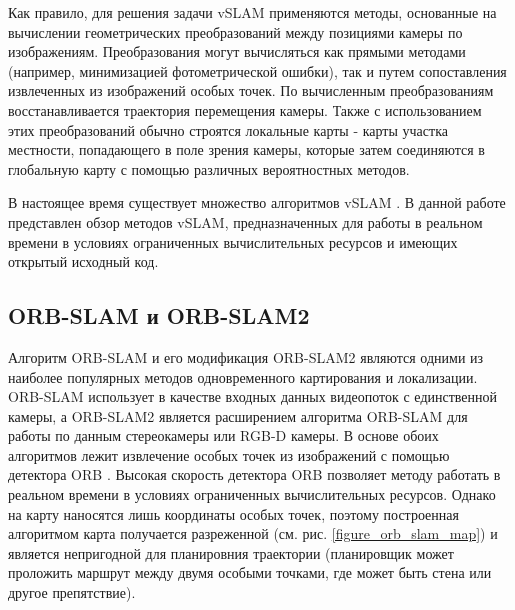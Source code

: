 \documentclass{mipt-thesis-ms}
\begin{document}
	Как правило, для решения задачи vSLAM применяются методы, основанные на вычислении геометрических преобразований между позициями камеры по изображениям. Преобразования могут вычисляться как прямыми методами (например, минимизацией фотометрической ошибки), так и путем сопоставления извлеченных из изображений особых точек. По вычисленным преобразованиям восстанавливается траектория перемещения камеры. Также с использованием этих преобразований обычно строятся локальные карты - карты участка местности, попадающего в поле зрения камеры, которые затем соединяются в глобальную карту с помощью различных вероятностных методов.
	
	В настоящее время существует множество алгоритмов vSLAM \cite{taketomi2017visual} \cite{fuentes2015visual}. В данной работе представлен обзор методов vSLAM, предназначенных для работы в реальном времени в условиях ограниченных вычислительных ресурсов и имеющих открытый исходный код.
	
	\subsection{ORB-SLAM и ORB-SLAM2}
	
	Алгоритм ORB-SLAM \cite{mur2015orb} и его модификация ORB-SLAM2 \cite{mur2017orb} являются одними из наиболее популярных методов одновременного картирования и локализации. ORB-SLAM использует в качестве входных данных видеопоток с единственной камеры, а ORB-SLAM2 является расширением алгоритма ORB-SLAM для работы по данным стереокамеры или RGB-D камеры. В основе обоих алгоритмов лежит извлечение особых точек из изображений с помощью детектора ORB \cite{rublee2011orb}. Высокая скорость детектора ORB позволяет методу работать в реальном времени в условиях ограниченных вычислительных ресурсов. Однако на карту наносятся лишь координаты особых точек, поэтому построенная алгоритмом карта получается разреженной (см. рис. \ref{figure_orb_slam_map}) и является непригодной для планировния траектории (планировщик может проложить маршрут между двумя особыми точками, где может быть стена или другое препятствие).
\end{document}
